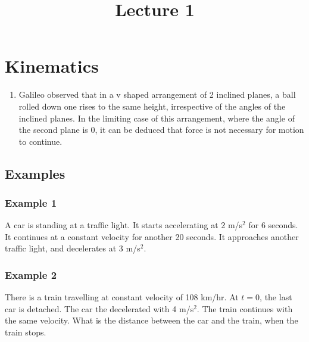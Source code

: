 \documentclass[]{article}
\title{Lecture 1}
\author{}
\date{\formatdate{28}{10}{2014}}
\begin{document}
\maketitle

\tableofcontents

\newpage
\section{Kinematics}

\begin{enumerate}
	\item	Galileo observed that in a v shaped arrangement of 2 inclined planes, a ball rolled down one rises to the same height, irrespective of the angles of the inclined planes. In the limiting case of this arrangement, where the angle of the second plane is 0, it can be deduced that force is not necessary for motion to continue.
\end{enumerate}



\newpage
\subsection{Examples}

\subsubsection{Example 1}

A car is standing at a traffic light. It starts accelerating at 2 m/s$^2$ for 6 seconds. It continues at a constant velocity for another 20 seconds. It approaches another traffic light, and decelerates at 3 m/s$^2$. \\

\noindent\resizebox{\textwidth}{!}
{
}
\subsubsection{Example 2}

There is a train travelling at constant velocity of 108 km/hr. At $t=0$, the last car is detached. The car the decelerated with 4 m/s$^2$. The train continues with the same velocity. What is the distance between the car and the train, when the train stops. \\
\end{document}
